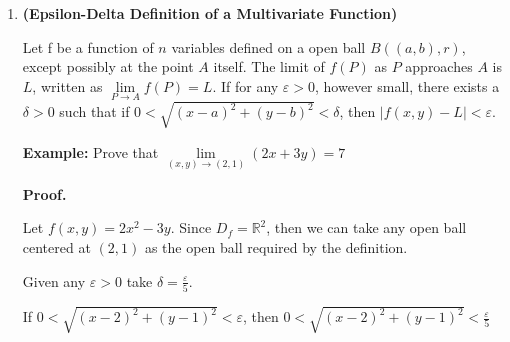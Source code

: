 \documentclass{article}
\begin{document}
\begin{enumerate}[start=1, label={\bfseries Theorem \arabic*:}, wide=0pt]
\textbf{Example:} Show that $\lim\limits_{(x,y)\to(0,0)} \frac{x^2-y^2}{x^2+y^2}$ does not exist.
\begin{align*}
\text{Let } S_1\{(x,y)&{}\lvert x=0\} \\
          &{} \lim_{\substack{(x,y) \to (0,0) \\ (x,y) \in S_2}} \left(\frac{x^2-y^2}{x^2+y^2}\right) =\lim_{y \rightarrow{0}} \left( \frac{-y^2}{y^2} \right) \lim_{y\rightarrow{0}}(-1)=-1
\end{align*}
\begin{align*}
\text{Let }S_2\{(x,y)&{}\lvert y=0\} \\
          &{} \lim_{\substack{(x,y) \to (0,0) \\ (x,y) \in S_2}} \left(\frac{x^2-y^2}{x^2+y^2}\right) =\lim_{x \rightarrow{0}} \left( \frac{x^2}{x^2} \right) \lim_{x\rightarrow{0}}(1)=1
\end{align*}
 
\vspace{-1em}

Since we've shown that  we've shown that 
    \[\lim_{\substack{(x,y) \to (x_0,y_0) \\ (x,y) \in S_1}} f(x,y) \neq \lim_{\substack{(x,y) \to (x_0,y_0) \\ (x,y) \in S_2}} f(x,y)\] 
    then $\lim\limits_{(x,y)\to(0,4)} \frac{x^2-y^2}{x^2+y^2}$ does not exist.

    \item \textbf{(Epsilon-Delta Definition of a Multivariate Function)} 
    
    Let f be a function of $n$ variables defined on a open ball $B((a,b),r)$, except possibly at the point $A$ itself. The limit of $f(P)$ as $P$ approaches $A$ is $L$, written as $\lim\limits_{P \to A} f(P)=L$. If for any $\varepsilon>0$, however small, there exists a $\delta>0$ such that if $0<\sqrt{(x-a)^2+(y-b)^2}<\delta$, then $\lvert f(x,y) - L\rvert<\varepsilon$.

\vspace{1em}
\textbf{Example:} Prove that $\lim\limits_{(x,y)\to(2,1)} (2x+3y)=7$

\textbf{Proof.} 

    Let $f(x,y)=2x^2-3y$. Since $D_f=\mathbb{R}^2$, then we can take any open ball centered at $(2,1)$ as the open ball required by the definition.

    Given any $\varepsilon>0$ take $\delta=\frac{\varepsilon}{5}$.

If $0<\sqrt{(x-2)^2+(y-1)^2}<\varepsilon$, then $0<\sqrt{(x-2)^2+(y-1)^2}<\frac{\varepsilon}{5}$ 


\end{enumerate}
\end{document}
